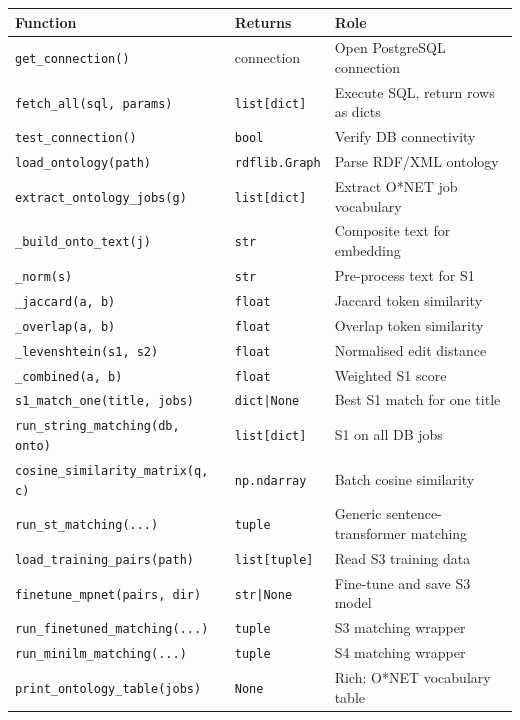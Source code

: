 ﻿\documentclass[12pt,a4paper]{article}
\begin{document}
\begin{longtable}{@{}P{6.5cm}P{3cm}P{5.5cm}@{}}
\toprule
\textbf{Function} & \textbf{Returns} & \textbf{Role} \\
\midrule
\endhead
\texttt{get\_connection()} & connection & Open PostgreSQL connection \\
\texttt{fetch\_all(sql, params)} & \texttt{list[dict]} & Execute SQL, return rows as dicts \\
\texttt{test\_connection()} & \texttt{bool} & Verify DB connectivity \\
\texttt{load\_ontology(path)} & \texttt{rdflib.Graph} & Parse RDF/XML ontology \\
\texttt{extract\_ontology\_jobs(g)} & \texttt{list[dict]} & Extract O*NET job vocabulary \\
\texttt{\_build\_onto\_text(j)} & \texttt{str} & Composite text for embedding \\
\texttt{\_norm(s)} & \texttt{str} & Pre-process text for S1 \\
\texttt{\_jaccard(a, b)} & \texttt{float} & Jaccard token similarity \\
\texttt{\_overlap(a, b)} & \texttt{float} & Overlap token similarity \\
\texttt{\_levenshtein(s1, s2)} & \texttt{float} & Normalised edit distance \\
\texttt{\_combined(a, b)} & \texttt{float} & Weighted S1 score \\
\texttt{s1\_match\_one(title, jobs)} & \texttt{dict|None} & Best S1 match for one title \\
\texttt{run\_string\_matching(db, onto)} & \texttt{list[dict]} & S1 on all DB jobs \\
\texttt{cosine\_similarity\_matrix(q, c)} & \texttt{np.ndarray} & Batch cosine similarity \\
\texttt{run\_st\_matching(...)} & \texttt{tuple} & Generic sentence-transformer matching \\
\texttt{load\_training\_pairs(path)} & \texttt{list[tuple]} & Read S3 training data \\
\texttt{finetune\_mpnet(pairs, dir)} & \texttt{str|None} & Fine-tune and save S3 model \\
\texttt{run\_finetuned\_matching(...)} & \texttt{tuple} & S3 matching wrapper \\
\texttt{run\_minilm\_matching(...)} & \texttt{tuple} & S4 matching wrapper \\
\texttt{print\_ontology\_table(jobs)} & \texttt{None} & Rich: O*NET vocabulary table \\

\end{longtable}
\end{document}
